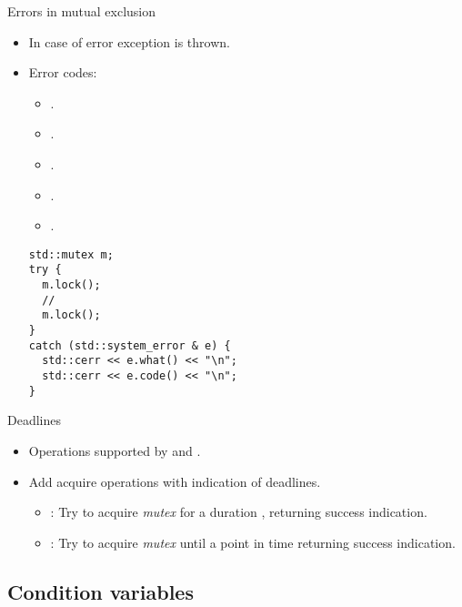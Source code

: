 \begin{frame}[fragile]{Errors in mutual exclusion}
\begin{itemize}
  \item In case of error exception  is thrown.
  \item Error codes:
    \begin{itemize}
      \item {}.
      \item {}.
      \item {}.
      \item {}.
      \item {}.
    \end{itemize}
\begin{lstlisting}
std::mutex m;
try {
  m.lock();
  // 
  m.lock();
}
catch (std::system_error & e) {
  std::cerr << e.what() << "\n";
  std::cerr << e.code() << "\n";
}
\end{lstlisting}
\end{itemize}
\end{frame}

\begin{frame}{Deadlines}
\begin{itemize}
  \item Operations supported by  and .
  \vfill
  \item Add acquire operations with indication of deadlines.
    \begin{itemize}
      \item {}: Try to acquire \emph{mutex} for a duration
            , returning success indication.
      \item {}: Try to acquire \emph{mutex} until a point in time
            returning success indication.
    \end{itemize}
\end{itemize}
\end{frame}

\subsection{Condition variables}

